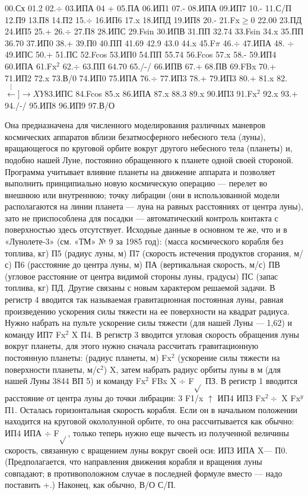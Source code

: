 \documentclass[11pt,a4paper,oneside]{article}
\def\XY{$\stackrel[\leftarrow]{\rightarrow}{XY}$}
\begin{document}
00.Сх 01.2	02.$\div$ 03.ИПА 04 + 05.ПА 06.ИП1
07.- 08.ИПА 09.ИП7 10.- 11.С/П 12.П9 13.П8 14.П2 15.$\div$ 16.ИП6 17.x 18.ИПД 19.ИП8 20.- 21.Fx$\geq$0 22.00 23.ПД 24.ИП5 25.+ 26.$\div$ 27.П8 28.ИПС 29.Fsin 30.ИПВ 31.ПП 32.74 33.Fsin 34.x 35.ПП 36.70 37.ИП0 38.+ 39.П0 40.ПП 41.69 42.9 43.0 44.x 45.F$\pi$ 46.$\div$ 47.ИПА 48. $\div$ 49.ИПС 50.+ 51.ПС 52.Fcos 53.ИП0 54.ПП 55.74
56.Fcos 57.x 58.- 59.ИП4 60.ИПА 61.Fx$^{2}$ 62.$\div$ 63.ПП 64.70 65./-/ 66.ИПВ 67.+
68.ПВ 69.FBx 70.+ 71.ИП2	72.x 73.В/0
74.ИП0 75.ИПА 76.$\div$ 77.ИП3 78.+ 79.ИП3 80.+ 81.x 82.\XY 83.ИПС 84.Fcos 85.x
86.ИПА 87.x 88.3	89.x 90.ИП3 91.Fx$^{2}$ 92.x
93.+ 94./-/ 95.ИП8 96.ИП9 97.В/О

Она предназначена для численного моделирования различных маневров космических аппаратов вблизи безатмосферного небесного тела (луны), вращающегося по круговой орбите вокруг другого небесного тела (планеты) и, подобно нашей Луне, постоянно обращенного к планете одной своей стороной. Программа учитывает влияние планеты на движение аппарата и позволяет выполнить принципиально новую космическую операцию — перелет во внешнюю или внутреннюю; точку либрации (они в использованной модели располагаются на линии планета — луна на равных расстояниях от центра луны), зато не приспособлена для посадки — автоматический контроль контакта с поверхностью здесь отсутствует. Исходные данные в основном те же, что и в «Лунолете-3» (см. «ТМ» № 9 за 1985 год): (масса космического корабля без топлива, кг) П5 (радиус луны, м) П7 (скорость истечения продуктов сгорания, м/с) П6 (расстояние до центра луны, м) ПА (вертикальная скорость, м/с) ПВ (угловое расстояние от центра видимой стороны луны, градусы) ПС (запас топлива, кг) ПД. Другие связаны с новым характером решаемой задачи. В регистр 4 вводится так называемая гравитационная постоянная луны, равная произведению ускорения силы тяжести на ее поверхности на квадрат радиуса. Нужно набрать на пульте ускорение силы тяжести (для нашей Луны — 1,62) и команду ИП7 Fx$^{2}$ X П4. В регистр 3 вводится угловая скорость обращения луны вокруг планеты, для этого нужно сначала рассчитать гравитационную постоянную планеты: (радиус планеты, м) Fx$^{2}$ (ускорение силы тяжести на поверхности планеты, м/с$^{2}$) X, затем набрать радиус орбиты луны в м (для нашей Луны 3844 ВП 5) и команду Fx$^{2}$ FBx X $\div$ F$\sqrt{}$ ПЗ. В регистр 1 вводится расстояние от центра луны до точки либрации: 3 F1/x $\uparrow$ ИП4 ИПЗ Fx$^{2}\div$ X Fx$^{y}$ П1. Осталась горизонтальная скорость корабля. Если он в начальном положении находится на круговой окололунной орбите, то она рассчитывается как обычно: ИП4 ИПА $\div$ F$\sqrt{}$, только теперь нужно еще вычесть из полученной величины скорость, связанную с вращением луны вокруг своей оси: ИПЗ ИПА X— П0. (Предполагается, что направления движения корабля и вращения луны совпадают; в противоположном случае в последней формуле вместо — надо поставить +.) Наконец, как обычно, В/О С/П.
\end{document}
